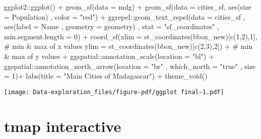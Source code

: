 \documentclass[
  letterpaper,
  DIV=11,
  numbers=noendperiod]{scrreprt}
\newenvironment{Shaded}{\begin{snugshade}}{\end{snugshade}}
\newcommand{\AttributeTok}[1]{\textcolor[rgb]{0.40,0.45,0.13}{#1}}
\newcommand{\CommentTok}[1]{\textcolor[rgb]{0.37,0.37,0.37}{#1}}
\newcommand{\DecValTok}[1]{\textcolor[rgb]{0.68,0.00,0.00}{#1}}
\newcommand{\FunctionTok}[1]{\textcolor[rgb]{0.28,0.35,0.67}{#1}}
\newcommand{\NormalTok}[1]{\textcolor[rgb]{0.00,0.23,0.31}{#1}}
\newcommand{\SpecialCharTok}[1]{\textcolor[rgb]{0.37,0.37,0.37}{#1}}
\newcommand{\StringTok}[1]{\textcolor[rgb]{0.13,0.47,0.30}{#1}}
\begin{document}
\begin{Shaded}
\begin{Highlighting}[]
\NormalTok{ggplot2}\SpecialCharTok{::}\FunctionTok{ggplot}\NormalTok{() }\SpecialCharTok{+}
  \FunctionTok{geom\_sf}\NormalTok{(}\AttributeTok{data =}\NormalTok{ mdg) }\SpecialCharTok{+}
  \FunctionTok{geom\_sf}\NormalTok{(}\AttributeTok{data =}\NormalTok{ cities\_sf, }\FunctionTok{aes}\NormalTok{(}\AttributeTok{size =}\NormalTok{ Population)}
\NormalTok{          , }\AttributeTok{color =} \StringTok{"red"}\NormalTok{) }\SpecialCharTok{+}
\NormalTok{  ggrepel}\SpecialCharTok{::}\FunctionTok{geom\_text\_repel}\NormalTok{(}\AttributeTok{data =}\NormalTok{ cities\_sf}
\NormalTok{               , }\FunctionTok{aes}\NormalTok{(}\AttributeTok{label =}\NormalTok{ Name}
\NormalTok{                     , }\AttributeTok{geometry =}\NormalTok{ geometry)}
\NormalTok{               , }\AttributeTok{stat =} \StringTok{"sf\_coordinates"}
\NormalTok{               , }\AttributeTok{min.segment.length =} \DecValTok{0}\NormalTok{) }\SpecialCharTok{+}
  \FunctionTok{coord\_sf}\NormalTok{(}\AttributeTok{xlim =} \FunctionTok{st\_coordinates}\NormalTok{(bbox\_new)[}\FunctionTok{c}\NormalTok{(}\DecValTok{1}\NormalTok{,}\DecValTok{2}\NormalTok{),}\DecValTok{1}\NormalTok{], }\CommentTok{\# min \& max of x values}
           \AttributeTok{ylim =} \FunctionTok{st\_coordinates}\NormalTok{(bbox\_new)[}\FunctionTok{c}\NormalTok{(}\DecValTok{2}\NormalTok{,}\DecValTok{3}\NormalTok{),}\DecValTok{2}\NormalTok{]) }\SpecialCharTok{+} \CommentTok{\# min \& max of y values +}
\NormalTok{  ggspatial}\SpecialCharTok{::}\FunctionTok{annotation\_scale}\NormalTok{(}\AttributeTok{location =} \StringTok{"bl"}\NormalTok{) }\SpecialCharTok{+}
\NormalTok{  ggspatial}\SpecialCharTok{::}\FunctionTok{annotation\_north\_arrow}\NormalTok{(}\AttributeTok{location =} \StringTok{"br"}
\NormalTok{                                    , }\AttributeTok{which\_north =} \StringTok{"true"}
\NormalTok{                                    , }\AttributeTok{size =} \DecValTok{1}\NormalTok{)}\SpecialCharTok{+}
  \FunctionTok{labs}\NormalTok{(}\AttributeTok{title =} \StringTok{"Main Cities of Madagascar"}\NormalTok{) }\SpecialCharTok{+}
  \FunctionTok{theme\_void}\NormalTok{()}
\end{Highlighting}
\end{Shaded}

\texttt{[image: Data-exploration\_files/figure-pdf/ggplot final-1.pdf]}

\section{tmap interactive}
\end{document}
